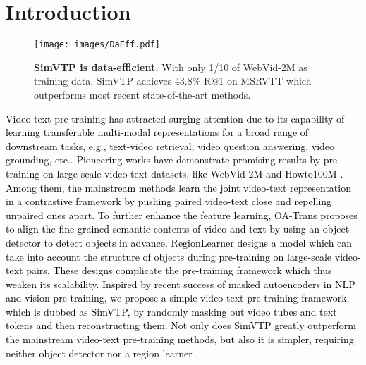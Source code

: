 \documentclass[10pt,twocolumn,letterpaper]{article}
\newcommand{\yty}[1]{\textcolor{black}{#1}}
\begin{document}
\section{Introduction}
\label{sec:intro}


\begin{figure}
	\texttt{[image: images/DaEff.pdf]}
	\caption{\textbf{SimVTP is data-efficient. }With only 1/10 of WebVid-2M as training data, SimVTP achieves 43.8\% R@1 on MSRVTT which outperforms most recent state-of-the-art methods.}
	\label{fig:1}
	\vspace{-0.5cm}
\end{figure}

\yty{Video-text pre-training has attracted surging attention due to its capability of learning transferable multi-modal representations for a broad range of downstream tasks, e.g., text-video retrieval\cite{cheng2021improving, bain2021frozen, yan2021video, wang2022object, liu2022ts2net}, video question answering\cite{fu2021violet, yang2021just, yu2018joint, torabi2016learning}, video grounding\cite{patrick2020support, miech2020end, tang2021decembert}, etc.. Pioneering works \cite{wang2022object, li2022align} have demonstrate promising results by pre-training on large scale video-text datasets, like WebVid-2M \cite{bain2021frozen} and Howto100M \cite{miech2019howto100m}. Among them, the mainstream methods \cite{bain2021frozen, cao2022locvtp} learn the joint video-text representation in a contrastive framework by pushing paired video-text close and repelling unpaired ones apart.  To further enhance the feature learning, OA-Trans \cite{wang2022object} proposes to align the fine-grained semantic contents of video and text  by using an object detector to detect objects in advance.   RegionLearner \cite{yan2021video} designs a
	model which can take into account the structure of objects during pre-training on large-scale video-text pairs, These designs complicate the pre-training framework which thus weaken its scalability. }
\yty{Inspired by recent success of masked autoencoders in NLP and vision pre-training,  we propose a simple video-text pre-training framework, which is dubbed as SimVTP, by randomly masking out video tubes and text tokens and then reconstructing them.  Not only does SimVTP greatly outperform the mainstream video-text pre-training methods, but also it is simpler, requiring neither object detector \cite{ren2015faster, cai2019cascade} nor a region learner \cite{yan2021video}.}
\end{document}
